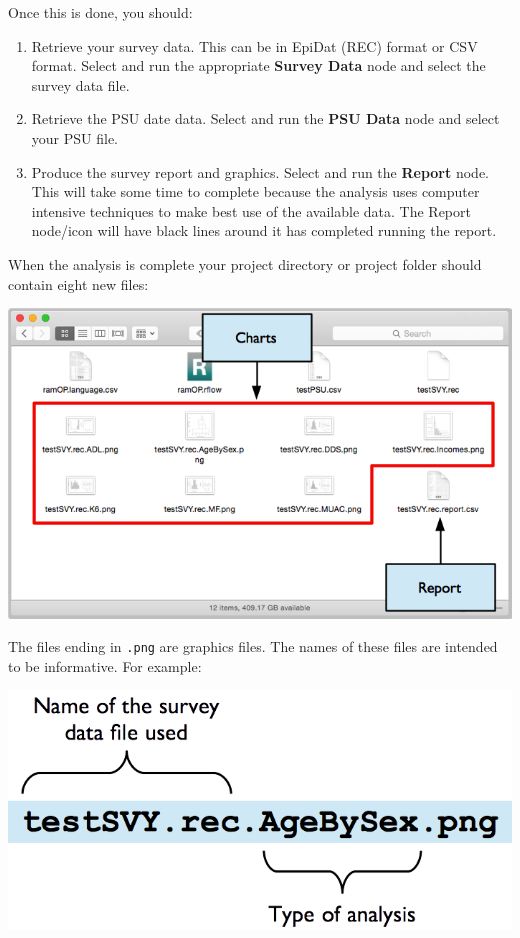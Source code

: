 \documentclass[12pt,a4paper]{book}
\theoremstyle{definition}
\theoremstyle{definition}
\theoremstyle{definition}
\theoremstyle{remark}
\begin{document}
Once this is done, you should:

\begin{enumerate}
\def\labelenumi{\arabic{enumi}.}
\item
  Retrieve your survey data. This can be in EpiDat (REC) format or CSV
  format. Select and run the appropriate \textbf{Survey Data} node and
  select the survey data file.
\item
  Retrieve the PSU date data. Select and run the \textbf{PSU Data} node
  and select your PSU file.
\item
  Produce the survey report and graphics. Select and run the
  \textbf{Report} node. This will take some time to complete because the
  analysis uses computer intensive techniques to make best use of the
  available data. The Report node/icon will have black lines around it
  has completed running the report.
\end{enumerate}

When the analysis is complete your project directory or project folder
should contain eight new files:

\begin{center}\includegraphics[width=9.76in]{figures/workflowResults01} \end{center}

The files ending in \texttt{.png} are graphics files. The names of these
files are intended to be informative. For example:

\begin{center}\includegraphics[width=9.76in]{figures/workflowResults02} \end{center}
\end{document}
